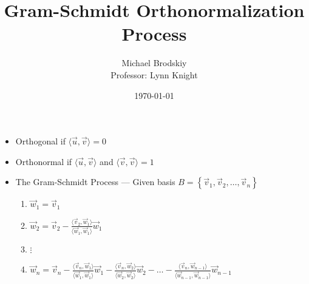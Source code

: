 \documentclass[12pt]{article}
\title{Gram-Schmidt Orthonormalization Process}
\date{\today}
\author{Michael Brodskiy\\ \small Professor: Lynn Knight}
\begin{document}
\maketitle

\begin{itemize}

  \item Orthogonal if $\langle\overrightarrow{u},\overrightarrow{v}\rangle=0$

  \item Orthonormal if $\langle\overrightarrow{u},\overrightarrow{v}\rangle$ and $\langle\overrightarrow{v},\overrightarrow{v}\rangle=1$

  \item The Gram-Schmidt Process — Given basis $B=\left\{ \overrightarrow{v}_1,\overrightarrow{v}_2,\dots,\overrightarrow{v}_n \right\}$

    \begin{enumerate}

      \item $\overrightarrow{w}_1=\overrightarrow{v}_1$

      \item $\overrightarrow{w}_2=\overrightarrow{v}_2-\frac{\langle\overrightarrow{v}_2,\overrightarrow{w}_1\rangle}{\langle\overrightarrow{w}_1,\overrightarrow{w}_1\rangle}\overrightarrow{w}_1$

      \item $\vdots$

      \item $\overrightarrow{w}_n=\overrightarrow{v}_n-\frac{\langle\overrightarrow{v}_n,\overrightarrow{w}_1\rangle}{\langle\overrightarrow{w}_1,\overrightarrow{w}_1\rangle}\overrightarrow{w}_1-\frac{\langle\overrightarrow{v}_n,\overrightarrow{w}_2\rangle}{\langle\overrightarrow{w}_2,\overrightarrow{w}_2\rangle}\overrightarrow{w}_2-\dots-\frac{\langle\overrightarrow{v}_n,\overrightarrow{w}_{n-1}\rangle}{\langle\overrightarrow{w}_{n-1},\overrightarrow{w}_{n-1}\rangle}\overrightarrow{w}_{n-1}$

    \end{enumerate}

\end{itemize}
\end{document}
